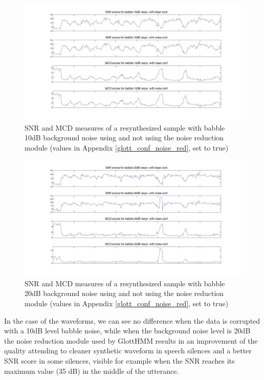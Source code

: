 \begin{figure}[!htbp]
\includegraphics[width=\textwidth]{images/babble10clean_vs_noise.jpg}
\caption{SNR and MCD measures of a resynthesized sample with babble 10dB background noise using and not using the noise reduction module (values in Appendix \ref{glott_conf_noise_red}, set to true)}
\label{fig:babble10_clean_vs_noise}
\end{figure}

\begin{figure}[!htbp]
\includegraphics[width=\textwidth]{images/babble20clean_vs_noise.jpg}
\caption{SNR and MCD measures of a resynthesized sample with babble 20dB background noise using and not using the noise reduction module (values in Appendix \ref{glott_conf_noise_red}, set to true)}
\label{fig:babble20_clean_vs_noise}
\end{figure}

In the case of the waveforms, we can see no difference when the data is corrupted with a 10dB level babble noise, while when the background noise level is 20dB the noise reduction module used by GlottHMM results in an improvement of the quality attending to cleaner synthetic waveform in speech silences and a better SNR score in some silences, visible for example when the SNR reaches its maximum value (35 dB) in the middle of the utterance. 

